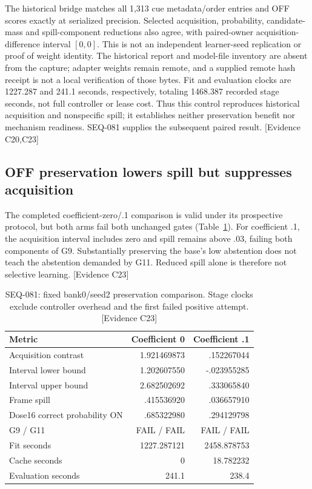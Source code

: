 \documentclass[11pt]{article}
\newcommand{\ev}[1]{\textsf{[Evidence #1]}}
\begin{document}
The historical bridge matches all 1,313 cue metadata/order entries and OFF
scores exactly at serialized precision. Selected acquisition, probability,
candidate-mass and spill-component reductions also agree, with paired-owner
acquisition-difference interval $[0,0]$. This is not an independent learner-seed
replication or proof of weight identity. The historical report and model-file
inventory are absent from the capture; adapter weights remain remote, and a
supplied remote hash receipt is not a local verification of those bytes.
Fit and evaluation clocks are 1227.287 and 241.1 seconds, respectively, totaling
1468.387 recorded stage seconds, not full controller or lease cost. Thus this
control reproduces historical acquisition and nonspecific spill; it establishes
neither preservation benefit nor mechanism readiness. SEQ-081 supplies the
subsequent paired result. \ev{C20,C23}

\subsection{OFF preservation lowers spill but suppresses acquisition}
The completed coefficient-zero/.1 comparison is valid under its prospective
protocol, but both arms fail both unchanged gates (Table~\ref{tab:preservation}).
For coefficient .1, the acquisition interval includes zero and spill remains
above .03, failing both components of G9. Substantially preserving the base's
low abstention does not teach the abstention demanded by G11. Reduced spill
alone is therefore not selective learning. \ev{C23}

\begin{table}[ht]
\centering
\begin{tabular}{lrr}
\toprule
Metric & Coefficient 0 & Coefficient .1 \\
\midrule
Acquisition contrast & 1.921469873 & .152267044 \\
Interval lower bound & 1.202607550 & -.023955285 \\
Interval upper bound & 2.682502692 & .333065840 \\
Frame spill & .415536920 & .036657910 \\
Dose16 correct probability ON & .685322980 & .294129798 \\
G9 / G11 & FAIL / FAIL & FAIL / FAIL \\
Fit seconds & 1227.287121 & 2458.878753 \\
Cache seconds & 0 & 18.782232 \\
Evaluation seconds & 241.1 & 238.4 \\
\bottomrule
\end{tabular}
\caption{SEQ-081: fixed bank0/seed2 preservation comparison. Stage clocks exclude
controller overhead and the first failed positive attempt. \ev{C23}}
\label{tab:preservation}
\end{table}
\end{document}

